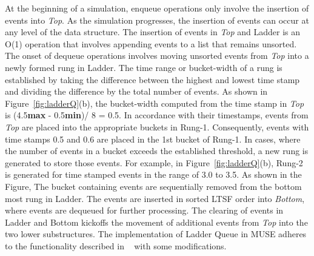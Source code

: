 At the beginning of a simulation, enqueue operations only involve the
insertion of events into \emph{Top}. As the simulation progresses, the
insertion of events can occur at any level of the data structure. The
insertion of events in \emph{Top} and Ladder is an O(1) operation that
involves appending events to a list that remains unsorted. The onset
of dequeue operations involves moving unsorted events from \emph{Top}
into a newly formed rung in Ladder. The time range or bucket-width of
a rung is established by taking the difference between the highest and
lowest time stamp and dividing the difference by the total number of
events. As shown in Figure~\ref{fig:ladderQ}(b), the bucket-width
computed from the time stamp in \emph{Top} is (4.5\textbf{max} -
0.5\textbf{min})/ 8 = 0.5. In accordance with their
timestamps, events from \emph{Top} are placed into the appropriate
buckets in Rung-1. Consequently, events with time stamps 0.5 and 0.6
are placed in the 1st bucket of Rung-1. In cases, where the number of
events in a bucket exceeds the established threshold, a new rung is
generated to store those events. For example, in
Figure~\ref{fig:ladderQ}(b), Rung-2 is generated for time stamped
events in the range of 3.0 to 3.5. As shown in the Figure, The bucket
containing events are sequentially removed from the bottom most rung
in Ladder. The events are inserted in sorted LTSF order into
\emph{Bottom}, where events are dequeued for further processing. The
clearing of events in Ladder and Bottom kickoffs the movement of
additional events from \emph{Top} into the two lower
substructures. The implementation of Ladder Queue in MUSE adheres to
the functionality described in ~\cite{tang-05} with some
modifications.


